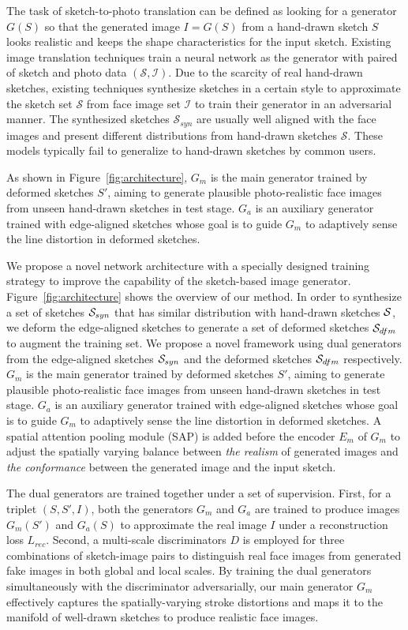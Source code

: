% 

The task of sketch-to-photo translation can be defined as looking for a generator $G(S)$ so that the generated image $I=G(S)$ from a hand-drawn sketch $S$ looks realistic and keeps the shape characteristics for the input sketch.
%
Existing image translation techniques train a neural network as the generator with paired of sketch and photo data $(\mathcal{S}, \mathcal{I})$.
%
Due to the scarcity of real hand-drawn sketches, existing techniques synthesize sketches in a certain style to approximate the sketch set $\mathcal{S}$ from face image set $\mathcal{I}$ to train their generator in an adversarial manner.
The synthesized sketches $\mathcal{S}_{syn}$ are usually well aligned with the face images and present different distributions from hand-drawn sketches $\mathcal{S}$.
These models typically fail to generalize to hand-drawn sketches by common users. 
%


As shown in Figure~\ref{fig:architecture}, $G_m$ is the main generator trained by deformed sketches $S'$, aiming to generate plausible photo-realistic face images from unseen hand-drawn sketches in test stage. 
$G_a$ is an auxiliary generator trained with edge-aligned sketches whose goal is to guide $G_m$ to adaptively sense the line distortion in deformed sketches.


We propose a novel network architecture with a specially designed training strategy to improve the capability of the sketch-based image generator.
%
Figure~\ref{fig:architecture} shows the overview of our method.
%
In order to synthesize a set of sketches $\mathcal{S}_{syn}$ that has similar distribution with hand-drawn sketches $\mathcal{S}$, we deform the edge-aligned sketches to generate a set of deformed sketches $\mathcal{S}_{dfm}$ to augment the training set.
We propose a novel framework using dual generators from the edge-aligned sketches $\mathcal{S}_{syn}$ and the deformed sketches $\mathcal{S}_{dfm}$ respectively.
%
$G_m$ is the main generator trained by deformed sketches $S'$, aiming to generate plausible photo-realistic face images from unseen hand-drawn sketches in test stage. 
$G_a$ is an auxiliary generator trained with edge-aligned sketches whose goal is to guide $G_m$ to adaptively sense the line distortion in deformed sketches.
%
A spatial attention pooling module (SAP) is added before the encoder $E_m$ of $G_m$ to adjust the spatially varying balance between \textit{the realism} of generated images and \textit{the conformance} between the generated image and the input sketch. 
%

The dual generators are trained together under a set of supervision. 
First, for a triplet $(S,S',I)$, both the generators $G_m$ and $G_a$ are trained to produce images $G_m(S')$ and $G_a(S)$ to approximate the real image $I$ under a reconstruction loss $L_{rec}$. 
Second, a multi-scale discriminators $D$ is employed for three combinations of sketch-image pairs to distinguish real face images from generated fake images in both global and local scales. 
By training the dual generators simultaneously with the discriminator adversarially, our main generator $G_m$ effectively captures the spatially-varying stroke distortions and maps it to the manifold of well-drawn sketches to produce realistic face images.


